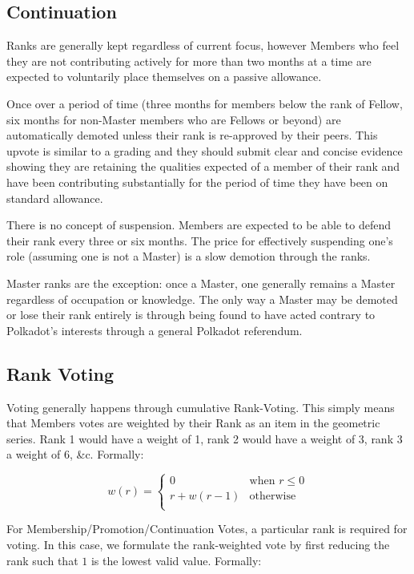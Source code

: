 \documentclass[9pt,oneside]{amsart}
\begin{document}
\subsection{Continuation}

Ranks are generally kept regardless of current focus, however Members who feel they are not contributing actively for more than two months at a time are expected to voluntarily place themselves on a passive allowance.

Once over a period of time (three months for members below the rank of Fellow, six months for non-Master members who are Fellows or beyond) are automatically demoted unless their rank is re-approved by their peers. This upvote is similar to a grading and they should submit clear and concise evidence showing they are retaining the qualities expected of a member of their rank and have been contributing substantially for the period of time they have been on standard allowance.

There is no concept of suspension. Members are expected to be able to defend their rank every three or six months. The price for effectively suspending one's role (assuming one is not a Master) is a slow demotion through the ranks.

Master ranks are the exception: once a Master, one generally remains a Master regardless of occupation or knowledge. The only way a Master may be demoted or lose their rank entirely is through being found to have acted contrary to Polkadot's interests through a general Polkadot referendum.

\subsection{Rank Voting}\label{rank-voting}

Voting generally happens through cumulative Rank-Voting. This simply means that Members votes are weighted by their Rank as an item in the geometric series. Rank 1 would have a weight of 1, rank 2 would have a weight of 3, rank 3 a weight of 6, \&c. Formally:

\begin{equation}
  w(r) = \begin{cases}
    0 & \text{when } r \leq 0 \\
    r + w(r - 1) & \text{otherwise} \\
  \end{cases}
\end{equation}

For Membership/Promotion/Continuation Votes, a particular rank is required for voting. In this case, we formulate the rank-weighted vote by first reducing the rank such that $1$ is the lowest valid value. Formally:
\end{document}
